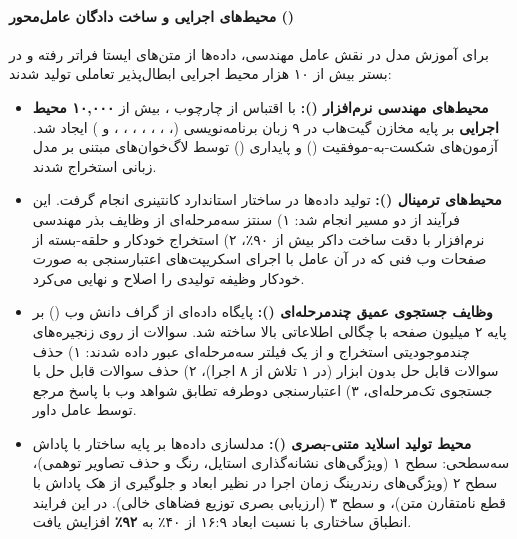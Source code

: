 \paragraph*{محیط‌های اجرایی و ساخت دادگان عامل‌محور ()}
برای آموزش مدل در نقش عامل مهندسی، داده‌ها از متن‌های ایستا فراتر رفته و در بستر بیش از ۱۰ هزار محیط اجرایی ابطال‌پذیر تعاملی تولید شدند:
\begin{itemize}
    \item \textbf{محیط‌های مهندسی نرم‌افزار ():} با اقتباس از چارچوب  \cite{zhang2025swebenchlive}، بیش از \textbf{۱۰,۰۰۰ محیط اجرایی} بر پایه مخازن گیت‌هاب در ۹ زبان برنامه‌نویسی (، ، ، ، ، ، ،  و ) ایجاد شد. آزمون‌های شکست-به-موفقیت () و پایداری () توسط لاگ‌خوان‌های مبتنی بر مدل زبانی استخراج شدند.
    \item \textbf{محیط‌های ترمینال ():} تولید داده‌ها در ساختار استاندارد کانتینری  \cite{harbor2026} انجام گرفت. این فرآیند از دو مسیر انجام شد: ۱) سنتز سه‌مرحله‌ای از وظایف بذر مهندسی نرم‌افزار با دقت ساخت داکر بیش از ۹۰٪، ۲) استخراج خودکار و حلقه-بسته از صفحات وب فنی که در آن عامل با اجرای اسکریپت‌های اعتبارسنجی  به صورت خودکار وظیفه تولیدی را اصلاح و نهایی می‌کرد.
    \item \textbf{وظایف جستجوی عمیق چندمرحله‌ای ():} پایگاه داده‌ای از گراف دانش وب () بر پایه ۲ میلیون صفحه با چگالی اطلاعاتی بالا ساخته شد. سوالات از روی زنجیره‌های چندموجودیتی استخراج و از یک فیلتر سه‌مرحله‌ای عبور داده شدند: ۱) حذف سوالات قابل حل بدون ابزار (در ۱ تلاش از ۸ اجرا)، ۲) حذف سوالات قابل حل با جستجوی تک‌مرحله‌ای، ۳) اعتبارسنجی دوطرفه تطابق شواهد وب با پاسخ مرجع توسط عامل داور.
    \item \textbf{محیط تولید اسلاید متنی-بصری ():} مدلسازی داده‌ها بر پایه ساختار  با پاداش سه‌سطحی: سطح ۱ (ویژگی‌های نشانه‌گذاری استایل، رنگ و حذف تصاویر توهمی)، سطح ۲ (ویژگی‌های رندرینگ زمان اجرا در  نظیر ابعاد و جلوگیری از هک پاداش با قطع نامتقارن متن)، و سطح ۳ (ارزیابی بصری توزیع فضاهای خالی). در این فرایند انطباق ساختاری با نسبت ابعاد ۱۶:۹ از ۴۰٪ به \textbf{۹۲٪} افزایش یافت.
\end{itemize}

